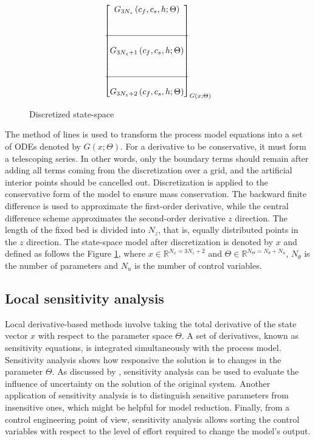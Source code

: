 \documentclass[a4paper,fleqn]{cas-dc}
\begin{document}
\begin{figure}[!h]
{\begin{align*}
{\begin{bmatrix}
						G_{3N_z} \left( c_f,c_s,h; \Theta \right) \\ 
						\\ \\ \hline \\
						G_{3N_z+1} \left( c_f,c_s,h; \Theta \right) \\
						\\ \\ \hline \\
						G_{3N_z+2} \left( c_f,c_s,h; \Theta \right) 
				\end{bmatrix}}_{G \left( x; \Theta \right)} 
		\end{align*} }
	\caption{Discretized state-space}
	\label{fig:discretization}
	\end{figure}

	The method of lines is used to transform the process model equations into a set of ODEs denoted by $G(x;\Theta)$. For a derivative to be conservative, it must form a telescoping series. In other words, only the boundary terms should remain after adding all terms coming from the discretization over a grid, and the artificial interior points should be cancelled out. Discretization is applied to the conservative form of the model to ensure mass conservation. The backward finite difference is used to approximate the first-order derivative, while the central difference scheme approximates the second-order derivative $z$ direction. The length of the fixed bed is divided into $N_z$, that is, equally distributed points in the $z$ direction. The state-space model after discretization is denoted by $x$ and defined as follows the Figure \ref{fig:discretization}, where $x \in \mathbb{R}^{N_x = 3N_z+2} $ and $\Theta \in \mathbb{R}^{N_\Theta =  N_{\theta} + N_u } $, $N_{\theta}$ is the number of parameters and $N_{u}$ is the number of control variables.
	
	\subsection{Local sensitivity analysis} \label{CH: Sensitivity_Analysis}
	
	Local derivative-based methods involve taking the total derivative of the state vector $x$ with respect to the parameter space $\Theta$. A set of derivatives, known as sensitivity equations, is integrated simultaneously with the process model. Sensitivity analysis shows how responsive the solution is to changes in the parameter $\Theta$. As discussed by \citet{Dickinson1976}, sensitivity analysis can be used to evaluate the influence of uncertainty on the solution of the original system. Another application of sensitivity analysis is to distinguish sensitive parameters from insensitive ones, which might be helpful for model reduction. Finally, from a control engineering point of view, sensitivity analysis allows sorting the control variables with respect to the level of effort required to change the model's output.
	
\end{document}
